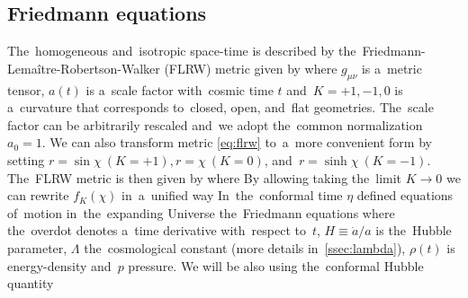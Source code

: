 \subsection{Friedmann equations}
The~homogeneous and~isotropic space-time is described by the~Friedmann-Lema\^{i}tre-Robertson-Walker (FLRW) metric given by
where $g_{\mu\nu}$ is a~metric tensor, $a(t)$ is a~scale factor with~cosmic time $t$ and~$K=+1,-1,0$ is a~curvature that corresponds to~closed, open, and~flat geometries. The~scale factor can be arbitrarily rescaled and~we adopt the~common normalization $a_0=1$. We can also transform metric \eqref{eq:flrw} to~a~more convenient form by setting $r=\sin\chi\ (K=+1),r=\chi\ (K=0)$, and~$r=\sinh\chi\ (K=-1)$. The~FLRW metric is then given by
where
By allowing taking the~limit $K\to0$ we can rewrite $f_K(\chi)$ in~a~unified way
In~\DIFdelbegin {}\DIFdelend \DIFaddbegin {}\DIFaddend the~conformal time $\eta$ defined \DIFdelbegin {}\DIFdelend \DIFaddbegin {}\DIFaddend {}
\DIFdelbegin {}\DIFdelend \DIFaddbegin {}\DIFaddend equations of~motion in~the~expanding Universe \DIFdelbegin {}\DIFdelend \DIFaddbegin {}\DIFaddend the~Friedmann equations
where the~overdot denotes a~time derivative with~respect to~$t$, $H\equiv\dot a/a$ is the~Hubble parameter, $\Lambda$ the~cosmological constant (more details in~\autoref{ssec:lambda}), $\rho(t)$ is energy-density and~$p$ pressure. We will be also using the~conformal Hubble quantity
